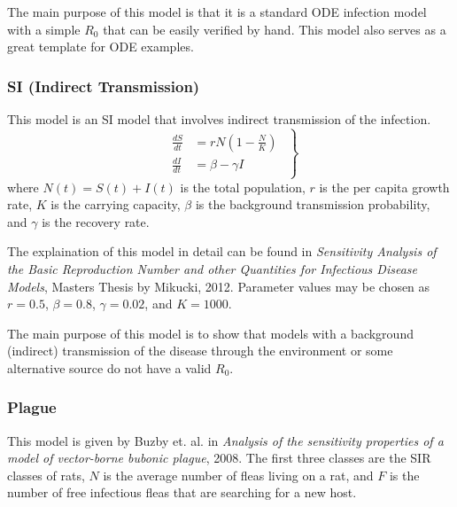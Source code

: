 \documentclass[12pt]{article}
\begin{document}
The main purpose of this model is that it is a standard ODE infection model with a simple $R_0$ that can be easily verified by hand.  This model also serves as a great template for ODE examples.

\subsubsection{SI (Indirect Transmission)}

This model is an SI model that involves indirect transmission of the infection.
%
\begin{equation*}\label{eq:background_si}
\left.\begin{gathered}\begin{aligned}
\frac{dS}{dt} &= rN\left(1-\frac{N}{K}\right)\\
\frac{dI}{dt} &= \beta -\gamma I
\end{aligned}\end{gathered}\right\}
\end{equation*}
%
where $N(t) = S(t) +I(t)$ is the total population, $r$ is the per capita growth rate, $K$ is the carrying capacity, $\beta$ is the background transmission probability, and $\gamma$ is the recovery rate.

The explaination of this model in detail can be found in \textit{Sensitivity Analysis of the Basic Reproduction Number and other Quantities for Infectious Disease Models}, Masters Thesis by Mikucki, 2012.  Parameter values may be chosen as  $r= 0.5$, $\beta = 0.8$, $\gamma = 0.02$, and $K = 1000$.

The main purpose of this model is to show that models with a background (indirect) transmission of the disease through the environment or some alternative source do not have a valid $R_0$.

\subsubsection{Plague}

This model is given by Buzby et. al. in \textit{Analysis of the sensitivity properties of a model of vector-borne bubonic plague}, 2008.  The first three classes are the SIR classes of rats, $N$ is the average number of fleas living on a rat, and $F$ is the number of free infectious fleas that are searching for a new host.
\end{document}
